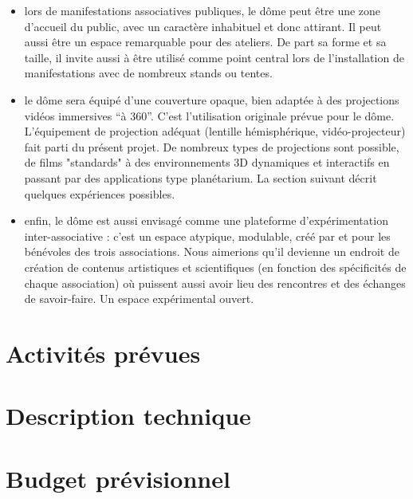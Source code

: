 \documentclass[a4paper,12pt]{report}
\begin{document}
\begin{itemize}
	\item lors de manifestations associatives publiques, le dôme peut 
	être une zone d'accueil du public, avec un caractère inhabituel et 
	donc attirant. Il peut aussi être un espace remarquable pour des 
	ateliers. De part sa forme et sa taille, il invite aussi à être utilisé comme 
	point central lors de l'installation de manifestations avec de 
	nombreux stands ou tentes.
	\item le dôme sera équipé d'une couverture opaque, bien adaptée à 
	des projections vidéos immersives ``à 360''. C'est l'utilisation 
	originale prévue pour le dôme. L'équipement de projection adéquat 
	(lentille hémisphérique, vidéo-projecteur) fait parti du présent projet.
	De nombreux types de projections sont possible, de films "standards" 
	à des environnements 3D dynamiques et interactifs en passant par des applications
	type planétarium. La section suivant décrit quelques expériences possibles.
	\item enfin, le dôme est aussi envisagé comme une plateforme 
	d'expérimentation inter-associative : c'est un espace atypique, 
	modulable, créé par et pour les bénévoles des trois associations. 
	Nous aimerions qu'il devienne un endroit de création de contenus 
	artistiques et scientifiques (en fonction des spécificités de chaque 
	association) où puissent aussi avoir lieu des rencontres et des échanges
	de savoir-faire. Un espace expérimental ouvert.
\end{itemize}

\chapter{Activités prévues}

\chapter{Description technique}

\chapter{Budget prévisionnel}
\end{document}
